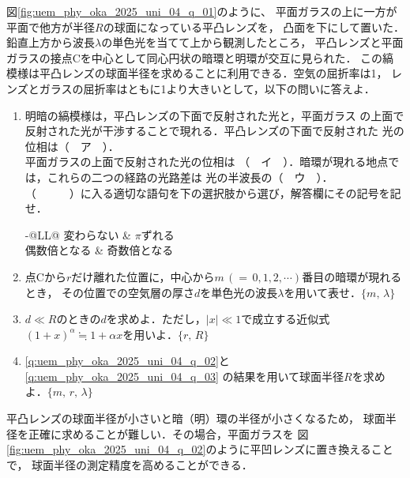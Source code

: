 \documentclass[../../../uem_phy_oka_q.tex]{subfiles}
\begin{document}
    図\ref{fig:uem_phy_oka_2025_uni_04_q_01}のように、%
    平面ガラスの上に一方が平面で他方が半径$R$の球面になっている平凸レンズを，%
    凸面を下にして置いた．鉛直上方から波長$\lambda$の単色光を当てて上から観測したところ，%
    平凸レンズと平面ガラスの接点Cを中心として同心円状の暗環と明環が交互に見られた．%
    この縞模様は平凸レンズの球面半径を求めることに利用できる．空気の屈折率は1，%
    レンズとガラスの屈折率はともに1より大きいとして，以下の問いに答えよ．

    \begin{enumerate}
        \item%
            明暗の縞模様は，平凸レンズの下面で反射された光と，平面ガラス%
            の上面で反射された光が干渉することで現れる．平凸レンズの下面で反射された%
            光の位相は（　\textsf{ア}　）．\\
            平面ガラスの上面で反射された光の位相は%
            （　\textsf{イ}　）．暗環が現れる地点では，これらの二つの経路の光路差は%
            光の半波長の（　\textsf{ウ}　）．\\
            （　　　）に入る適切な語句を下の選択肢から選び，解答欄にその記号を記せ．

            {\renewcommand{\arraystretch}{1.1}%
                \begin{tabularx}{\dimexpr\linewidth-\zw}{@{}LL@{}}
                    \; 変わらない & \; $\pi$ずれる \\
                    \; 偶数倍となる & \; 奇数倍となる                
                \end{tabularx}%
            }
        \item%
            点Cから$r$だけ離れた位置に，中心から$m\,({=}\,0,1,2,\cdots)$番目の暗環が現れるとき，%
            その位置での空気層の厚さ$d$を単色光の波長$\lambda$を用いて表せ．$\{m,\,\lambda\}$
            \label{q:uem_phy_oka_2025_uni_04_q_02}
        \item%
            $d\ll R$のときの$d$を求めよ．ただし，$|x|\ll 1$で成立する近似式%
            $(1+x)^\alpha \fallingdotseq 1+\alpha x$を用いよ．$\{r,\,R\}$
            \label{q:uem_phy_oka_2025_uni_04_q_03}
        \item%
            \ref{q:uem_phy_oka_2025_uni_04_q_02}と\ref{q:uem_phy_oka_2025_uni_04_q_03}%
            の結果を用いて球面半径$R$を求めよ．$\{m,\,r,\,\lambda\}$            
    \end{enumerate}

    平凸レンズの球面半径が小さいと暗（明）環の半径が小さくなるため，%
    球面半径を正確に求めることが難しい．その場合，平面ガラスを%
    図\ref{fig:uem_phy_oka_2025_uni_04_q_02}のように平凹レンズに置き換えることで，%
    球面半径の測定精度を高めることができる．
\end{document}
